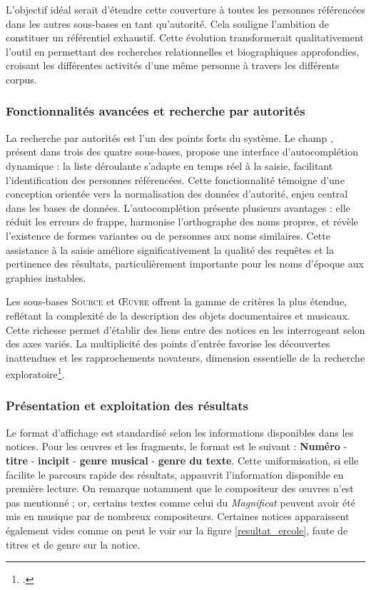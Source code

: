 L'objectif idéal serait d'étendre cette couverture à toutes les personnes référencées dans les autres sous-bases en tant qu'autorité. Cela souligne l'ambition de constituer un référentiel  exhaustif. Cette évolution transformerait qualitativement l'outil en permettant des recherches relationnelles et biographiques approfondies, croisant les différentes activités d'une même personne à travers les différents corpus.

\subsubsection{Fonctionnalités avancées et recherche par autorités}

La recherche par autorités est l'un des points forts du système. Le champ , présent dans trois des quatre sous-bases, propose une interface d'autocomplétion dynamique : la liste déroulante s'adapte en temps réel à la saisie, facilitant l'identification des personnes référencées. Cette fonctionnalité témoigne d'une conception orientée vers la normalisation des données d'autorité, enjeu central dans les bases de données. L'autocomplétion présente plusieurs avantages : elle réduit les erreurs de frappe, harmonise l'orthographe des noms propres, et révèle l'existence de formes variantes ou de personnes aux noms similaires. Cette assistance à la saisie améliore significativement la qualité des requêtes et la pertinence des résultats, particulièrement importante pour les noms d'époque aux graphies instables.

Les sous-bases \textsc{Source} et \textsc{Œuvre} offrent la gamme de critères la plus étendue, reflétant la complexité de la description des objets documentaires et musicaux. Cette richesse permet d'établir des liens entre des notices en les interrogeant selon des axes variés. La multiplicité des points d'entrée favorise les découvertes inattendues et les rapprochements novateurs, dimension essentielle de la recherche exploratoire\footcite{laurentguilloRapportMigrationAnciennes2022}.

\subsubsection{Présentation et exploitation des résultats}

Le format d'affichage est standardisé selon les informations disponibles dans les notices. Pour les œuvres et les fragments, le format est le suivant : \textbf{Numéro} - \textbf{titre} - \textbf{incipit} - \textbf{genre musical} - \textbf{genre du texte}. Cette uniformisation, si elle facilite le parcours rapide des résultats, appauvrit l'information disponible en première lecture. On remarque notamment que le compositeur des œuvres n'est pas mentionné ; or, certains textes comme celui du \textit{Magnificat} peuvent avoir été mis en musique par de nombreux compositeurs. Certaines notices apparaissent également vides comme on peut le voir sur la figure \ref{resultat_ercole}, faute de titres et de genre sur la notice.

